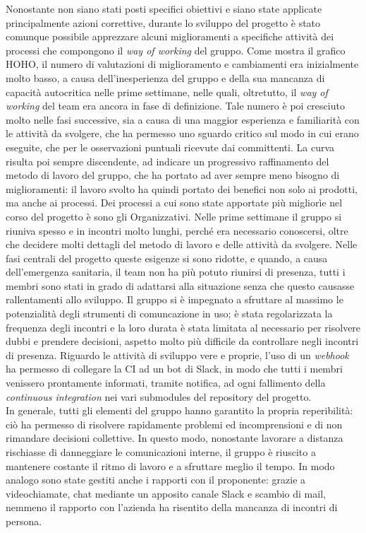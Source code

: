 	\newline\newline
	Nonostante non siano stati posti specifici obiettivi e siano state applicate principalmente azioni correttive, durante lo sviluppo del progetto è stato comunque possibile apprezzare alcuni miglioramenti a specifiche attività dei processi che compongono il \textit{way of working} del gruppo. Come mostra il grafico HOHO, il numero di valutazioni di miglioramento e cambiamenti era inizialmente molto basso, a causa dell'inesperienza del gruppo e della sua mancanza di capacità autocritica nelle prime settimane, nelle quali, oltretutto, il \textit{way of working} del team era ancora in fase di definizione. Tale numero è poi cresciuto molto nelle fasi successive, sia a causa di una maggior esperienza e familiarità con le attività da svolgere, che ha permesso uno sguardo critico sul modo in cui erano eseguite, che per le osservazioni puntuali ricevute dai committenti. La curva risulta poi sempre discendente, ad indicare un progressivo raffinamento del metodo di lavoro del gruppo, che ha portato ad aver sempre meno bisogno di miglioramenti: il lavoro svolto ha quindi portato dei benefici non solo ai prodotti, ma anche ai processi.
	\newline\newline
	Dei processi a cui sono state apportate più migliorìe nel corso del progetto è sono gli Organizzativi. Nelle prime settimane il gruppo si riuniva spesso e in incontri molto lunghi, perché era necessario conoscersi, oltre che decidere molti dettagli del metodo di lavoro e delle attività da svolgere. Nelle fasi centrali del progetto queste esigenze si sono ridotte, e quando, a causa dell'emergenza sanitaria, il team non ha più potuto riunirsi di presenza, tutti i membri sono stati in grado di adattarsi alla situazione senza che questo causasse rallentamenti allo sviluppo. Il gruppo si è impegnato a sfruttare al massimo le potenzialità degli strumenti di comuncazione in uso; è stata regolarizzata la frequenza degli incontri e la loro durata è stata limitata al necessario per risolvere dubbi e prendere decisioni, aspetto molto più difficile da controllare negli incontri di presenza. Riguardo le attività di sviluppo  vere e proprie, l'uso di un \textit{webhook} ha permesso di collegare la CI ad un bot di Slack, in modo che tutti i membri venissero prontamente informati, tramite notifica, ad ogni fallimento della \textit{continuous integration} nei vari submodules del repository del progetto. 
	\\In generale, tutti gli elementi del gruppo hanno garantito la propria reperibilità: ciò ha permesso di risolvere rapidamente problemi ed incomprensioni e di non rimandare decisioni collettive. In questo modo, nonostante lavorare a distanza rischiasse di danneggiare le comunicazioni interne, il gruppo è riuscito a mantenere costante il ritmo di lavoro e a sfruttare meglio il tempo. In modo analogo sono state gestiti anche i rapporti con il proponente: grazie a videochiamate, chat mediante un apposito canale Slack e scambio di mail, nemmeno il rapporto con l'azienda ha risentito della mancanza di incontri di persona.
